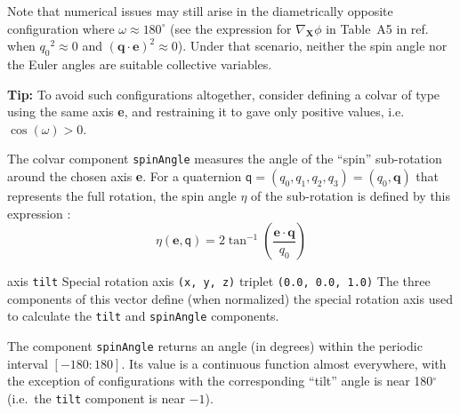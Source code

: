 Note that numerical issues may still arise in the diametrically opposite configuration where $\omega \approx 180^{\circ}$ (see the expression for $\nabla_{\mathbf{X}}\phi$ in Table~A5 in ref.\ \citealp{Fiorin2013} when ${q_{0}}^{2} \approx 0$ and $\left({\mathbf{q}}\cdot\mathbf{e}\right)^{2} \approx 0$).
Under that scenario, neither the spin angle nor the Euler angles are suitable collective variables.

\textbf{Tip:} To avoid such configurations altogether, consider defining a colvar of type  using the same axis \textbf{e}, and restraining it to gave only positive values, i.e.\ $\cos(\omega) > 0$.

The colvar component \texttt{spinAngle} measures the angle of the ``spin'' sub-rotation around the chosen axis \textbf{e}.
For a quaternion $\mathsf{q} = (q_0, q_1, q_2, q_3) = (q_0, \mathbf{q})$ that represents the full
rotation, the spin angle $\eta$ of the
sub-rotation is defined by this expression \cite{Daniilidis1999,Hu2006}:
\begin{equation}
  \label{eq:cvc_spinAngle}
  \eta \left(\mathbf{e}, \mathsf{q}\right) = 2 \tan^{-1}\left(\dfrac{\mathbf{e} \cdot \mathbf{q}}{q_0}\right)
\end{equation}

\begin{cvcoptions}
\item %
\item %
\item %
\item %
  \keydef
    {axis}{%
    \texttt{tilt}}{%
    Special rotation axis}{%
    \texttt{(x, y, z)} triplet}{%
    \texttt{(0.0, 0.0, 1.0)}}{%
    The three components of this vector define (when normalized) the special rotation axis used to calculate the \texttt{tilt} and \texttt{spinAngle} components.}
\end{cvcoptions}
The component \texttt{spinAngle} returns an angle (in degrees) within the periodic interval $[-180:180]$.
Its value is a continuous function almost everywhere, with the exception of configurations with the corresponding ``tilt'' angle is near 180$^\circ$ (i.e.~the \texttt{tilt} component is near $-1$).


